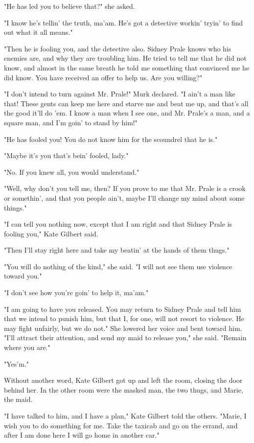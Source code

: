 \documentclass{novel}
\begin{document}
"He has led you to believe that?" she asked.

"I know he's tellin' the truth, ma'am. He's got a detective workin' tryin' to find out what it all means."

"Then he is fooling you, and the detective also. Sidney Prale knows who his enemies are, and why they are troubling him. He tried to tell me that he did not know, and almost in the same breath he told me something that convinced me he did know. You have received an offer to help us. Are you willing?"

"I don't intend to turn against Mr. Prale!" Murk declared. "I ain't a man like that! These gents can keep me here and starve me and beat me up, and that's all the good it'll do 'em. I know a man when I see one, and Mr. Prale's a man, and a square man, and I'm goin' to stand by him!"

"He has fooled you! You do not know him for the scoundrel that he is."

"Maybe it's you that's bein' fooled, lady."

"No. If you knew all, you would understand."

"Well, why don't you tell me, then? If you prove to me that Mr. Prale is a crook or somethin', and that you people ain't, maybe I'll change my mind about some things."

"I can tell you nothing now, except that I am right and that Sidney Prale is fooling you," Kate Gilbert said.

"Then I'll stay right here and take my beatin' at the hands of them thugs."

"You will do nothing of the kind," she said. "I will not see them use violence toward you."

"I don't see how you're goin' to help it, ma'am."

"I am going to have you released. You may return to Sidney Prale and tell him that we intend to punish him, but that I, for one, will not resort to violence. He may fight unfairly, but we do not." She lowered her voice and bent toward him. "I'll attract their attention, and send my maid to release you," she said. "Remain where you are."

"Yes'm."

Without another word, Kate Gilbert got up and left the room, closing the door behind her. In the other room were the masked man, the two thugs, and Marie, the maid.

"I have talked to him, and I have a plan," Kate Gilbert told the others. "Marie, I wish you to do something for me. Take the taxicab and go on the errand, and after I am done here I will go home in another car."
\end{document}
